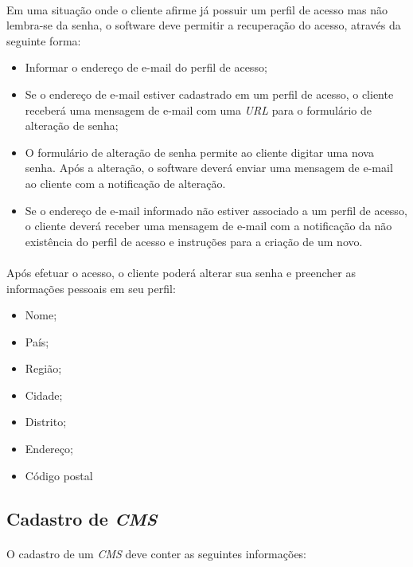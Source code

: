 \documentclass[a4paper,12pt]{article}
\def\cms{\emph{CMS}}
\begin{document}
\paragraph{}
Em uma situação onde o cliente afirme já possuir um perfil de acesso mas não lembra-se da senha, o software deve permitir a recuperação do acesso, através da seguinte forma:
\begin{itemize}
\item Informar o endereço de e-mail do perfil de acesso;
\item Se o endereço de e-mail estiver cadastrado em um perfil de acesso, o cliente receberá uma mensagem de e-mail com uma \emph{URL} para o formulário de alteração de senha;
\item O formulário de alteração de senha permite ao cliente digitar uma nova senha. Após a alteração, o software deverá enviar uma mensagem de e-mail ao cliente com a notificação de alteração.
\item Se o endereço de e-mail informado não estiver associado a um perfil de acesso, o cliente deverá receber uma mensagem de e-mail com a notificação da não existência do perfil de acesso e instruções para a criação de um novo.
\end{itemize}
\paragraph{}
Após efetuar o acesso, o cliente poderá alterar sua senha e preencher as informações pessoais em seu perfil:

\begin{itemize}
\item Nome;
\item País;
\item Região;
\item Cidade;
\item Distrito;
\item Endereço;
\item Código postal
\end{itemize}

\subsection{Cadastro de \cms{}}

\paragraph{}
O cadastro de um \cms{} deve conter as seguintes informações:
\end{document}
